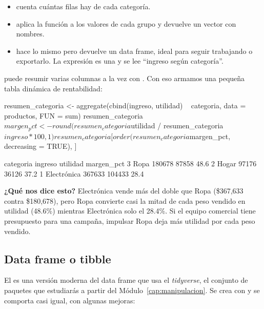 \begin{itemize}
  \item {} cuenta cuántas filas hay de cada categoría.
  \item {} aplica la función a los
        valores de cada grupo y devuelve un vector con nombres.
  \item {} hace lo mismo pero devuelve un data frame,
        ideal para seguir trabajando o exportarlo. La expresión
         es una
         y se lee ``ingreso según categoría''.
\end{itemize}

 puede resumir varias columnas a la vez con
. Con eso armamos una pequeña tabla dinámica de
rentabilidad:

\begin{rcode}
resumen_categoria <- aggregate(cbind(ingreso, utilidad) ~ categoria,
                               data = productos, FUN = sum)
resumen_categoria$margen_pct <- round(resumen_categoria$utilidad /
                                        resumen_categoria$ingreso * 100, 1)
resumen_categoria[order(resumen_categoria$margen_pct,
                        decreasing = TRUE), ]
\end{rcode}
\begin{rsalida}
    categoria ingreso utilidad margen_pct
3        Ropa  180678    87858       48.6
2       Hogar   97176    36126       37.2
1 Electrónica  367633   104433       28.4
\end{rsalida}

\textbf{¿Qué nos dice esto?} Electrónica vende más del doble que Ropa
(\$367,633 contra \$180,678), pero Ropa convierte casi la mitad de cada peso
vendido en utilidad (48.6\%) mientras Electrónica solo el 28.4\%. Si el
equipo comercial tiene presupuesto para una campaña, impulsar Ropa deja
más utilidad por cada peso vendido.

\subsection{Data frame o tibble}

El  es una versión moderna del data frame que usa el
\emph{tidyverse}, el conjunto de paquetes que estudiarás a partir del
Módulo~\ref{cap:manipulacion}. Se crea con  y se
comporta casi igual, con algunas mejoras:

